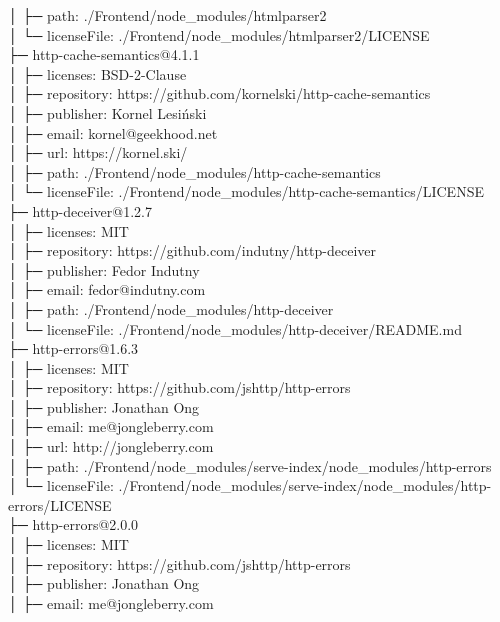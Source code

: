 \documentclass[
    paper=a4,
    twoside=false,
    parskip=half,
    listof=entryprefix,
    listof=totoc,
    index=totoc,
    bibliography=totoc,
    headsepline,
]{scrbook}
\begin{document}
    │  ├─ path: ./Frontend/node\_modules/htmlparser2\\
    │  └─ licenseFile: ./Frontend/node\_modules/htmlparser2/LICENSE\\
    ├─ http-cache-semantics@4.1.1\\
    │  ├─ licenses: BSD-2-Clause\\
    │  ├─ repository: https://github.com/kornelski/http-cache-semantics\\
    │  ├─ publisher: Kornel Lesiński\\
    │  ├─ email: kornel@geekhood.net\\
    │  ├─ url: https://kornel.ski/\\
    │  ├─ path: ./Frontend/node\_modules/http-cache-semantics\\
    │  └─ licenseFile: ./Frontend/node\_modules/http-cache-semantics/LICENSE\\
    ├─ http-deceiver@1.2.7\\
    │  ├─ licenses: MIT\\
    │  ├─ repository: https://github.com/indutny/http-deceiver\\
    │  ├─ publisher: Fedor Indutny\\
    │  ├─ email: fedor@indutny.com\\
    │  ├─ path: ./Frontend/node\_modules/http-deceiver\\
    │  └─ licenseFile: ./Frontend/node\_modules/http-deceiver/README.md\\
    ├─ http-errors@1.6.3\\
    │  ├─ licenses: MIT\\
    │  ├─ repository: https://github.com/jshttp/http-errors\\
    │  ├─ publisher: Jonathan Ong\\
    │  ├─ email: me@jongleberry.com\\
    │  ├─ url: http://jongleberry.com\\
    │  ├─ path: ./Frontend/node\_modules/serve-index/node\_modules/http-errors\\
    │  └─ licenseFile: ./Frontend/node\_modules/serve-index/node\_modules/http-errors/LICENSE\\
    ├─ http-errors@2.0.0\\
    │  ├─ licenses: MIT\\
    │  ├─ repository: https://github.com/jshttp/http-errors\\
    │  ├─ publisher: Jonathan Ong\\
    │  ├─ email: me@jongleberry.com\\
\end{document}
